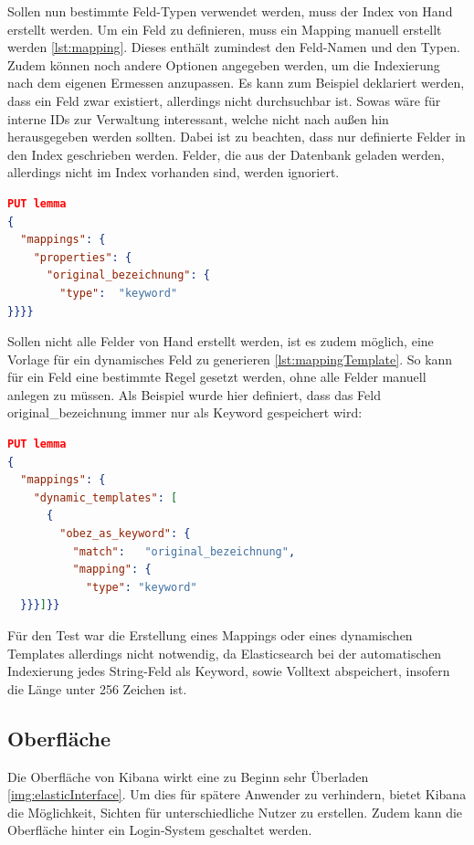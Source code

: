 Sollen nun bestimmte Feld-Typen verwendet werden, muss der Index von Hand erstellt werden. Um ein Feld zu definieren, muss ein Mapping manuell erstellt werden \ref{lst:mapping}. Dieses enthält zumindest den Feld-Namen und den Typen. Zudem können noch andere Optionen angegeben werden, um die Indexierung nach dem eigenen Ermessen anzupassen. Es kann zum Beispiel deklariert werden, dass ein Feld zwar existiert, allerdings nicht durchsuchbar ist. Sowas wäre für interne IDs zur Verwaltung interessant, welche nicht nach außen hin herausgegeben werden sollten. Dabei ist zu beachten, dass nur definierte Felder in den Index geschrieben werden. Felder, die aus der Datenbank geladen werden, allerdings nicht im Index vorhanden sind, werden ignoriert.

\begin{lstlisting}[language=JSON, frame=single, label={lst:mapping}, caption=Mapping für Elasticsearch Index,captionpos=b] 
PUT lemma
{
  "mappings": {
    "properties": {
      "original_bezeichnung": {
        "type":  "keyword"
}}}}
\end{lstlisting}

Sollen nicht alle Felder von Hand erstellt werden, ist es zudem möglich, eine Vorlage für ein dynamisches Feld zu generieren \ref{lst:mappingTemplate}. So kann für ein Feld eine bestimmte Regel gesetzt werden, ohne alle Felder manuell anlegen zu müssen. Als Beispiel wurde hier definiert, dass das Feld original\_bezeichnung immer nur als Keyword gespeichert wird:

\begin{lstlisting}[language=JSON, frame=single, label={lst:mappingTemplate}, caption=Dynamic-Mapping für Elasticsearch Index,captionpos=b] 
PUT lemma
{
  "mappings": {
    "dynamic_templates": [
      {
        "obez_as_keyword": {
          "match":   "original_bezeichnung",
          "mapping": {
            "type": "keyword"
  }}}]}}
\end{lstlisting}

Für den Test war die Erstellung eines Mappings oder eines dynamischen Templates allerdings nicht notwendig, da Elasticsearch bei der automatischen Indexierung jedes String-Feld als Keyword, sowie Volltext abspeichert, insofern die Länge unter 256 Zeichen ist.

\subsection{Oberfläche}

Die Oberfläche von Kibana wirkt eine zu Beginn  sehr Überladen \ref{img:elasticInterface}. Um dies für spätere Anwender zu verhindern, bietet Kibana die Möglichkeit, Sichten für unterschiedliche Nutzer zu erstellen. Zudem kann die Oberfläche hinter ein Login-System geschaltet werden.

